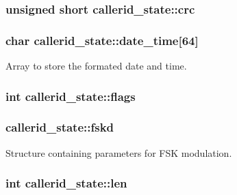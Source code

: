 \subsubsection[{crc}]{\setlength{\rightskip}{0pt plus 5cm}unsigned short callerid\+\_\+state\+::crc}\label{structcallerid__state_a66aba9a925c45880b6b61a1dcc389e73}
\hypertarget{structcallerid__state_a8d42244ee94ebf3e63931b2dd9f7bd82}{}
\subsubsection[{date\+\_\+time}]{\setlength{\rightskip}{0pt plus 5cm}char callerid\+\_\+state\+::date\+\_\+time\mbox{[}64\mbox{]}}\label{structcallerid__state_a8d42244ee94ebf3e63931b2dd9f7bd82}


Array to store the formated date and time. 

\hypertarget{structcallerid__state_a8282272c310e273ff345babd81adae4a}{}
\subsubsection[{flags}]{\setlength{\rightskip}{0pt plus 5cm}int callerid\+\_\+state\+::flags}\label{structcallerid__state_a8282272c310e273ff345babd81adae4a}
\hypertarget{structcallerid__state_a7a53484d75efb8c9b751f553766cbdf6}{}
\subsubsection[{fskd}]{ callerid\+\_\+state\+::fskd}\label{structcallerid__state_a7a53484d75efb8c9b751f553766cbdf6}


Structure containing parameters for F\+S\+K modulation. 

\hypertarget{structcallerid__state_a2a6a106f73258e45b760ea3e5bd2ef74}{}
\subsubsection[{len}]{\setlength{\rightskip}{0pt plus 5cm}int callerid\+\_\+state\+::len}\label{structcallerid__state_a2a6a106f73258e45b760ea3e5bd2ef74}
\hypertarget{structcallerid__state_a521ec0abccd42445c58230ba7cb4856d}{}
